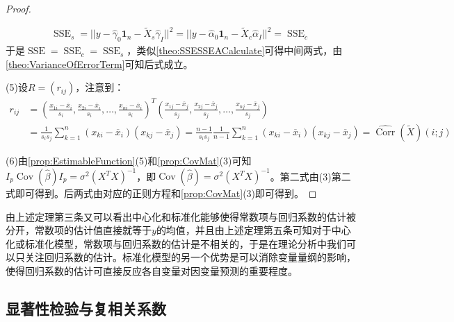 \begin{proof}
\begin{gather*}
\begin{aligned}
		\end{aligned} \\
		\operatorname{SSE}_s=||y-\hat{\gamma}_0\mathbf{1}_n-\tilde{X}_s\hat{\gamma}_I||^2=||y-\hat{\alpha}_0\mathbf{1}_n-\tilde{X}_c\hat{\alpha}_I||^2=\operatorname{SSE}_c
	\end{gather*}
	于是$\operatorname{SSE}=\operatorname{SSE}_c=\operatorname{SSE}_s$，类似\cref{theo:SSESSEACalculate}可得中间两式，由\cref{theo:VarianceOfErrorTerm}可知后式成立。\par
	(5)设$R=(r_{ij})$，注意到：
	\begin{align*}
		r_{ij}&=\left(\frac{x_{1i}-\overline{x}_i}{s_i},\frac{x_{2i}-\overline{x}_i}{s_i},\dots,\frac{x_{ni}-\overline{x}_i}{s_i}\right)^T\left(\frac{x_{1j}-\overline{x}_j}{s_j},\frac{x_{2j}-\overline{x}_j}{s_j},\dots,\frac{x_{nj}-\overline{x}_j}{s_j}\right) \\
		&=\frac{1}{s_is_j}\sum_{k=1}^{n}(x_{ki}-\overline{x}_i)(x_{kj}-\overline{x}_j)=\frac{n-1}{s_is_j}\frac{1}{n-1}\sum_{k=1}^{n}(x_{ki}-\overline{x}_i)(x_{kj}-\overline{x}_j)=\widehat{\operatorname{Corr}}(\tilde{X})(i;j)
	\end{align*}\par
	(6)由\cref{prop:EstimableFunction}(5)和\cref{prop:CovMat}(3)可知$I_p\operatorname{Cov}(\hat{\beta})I_p=\sigma^2(X^TX)^{-1}$，即$\operatorname{Cov}(\hat{\beta})=\sigma^2(X^TX)^{-1}$。第二式由(3)第二式即可得到。后两式由对应的正则方程和\cref{prop:CovMat}(3)即可得到。
\end{proof}
\begin{note}
	由上述定理第三条又可以看出中心化和标准化能够使得常数项与回归系数的估计被分开，常数项的估计值直接就等于$y$的均值，并且由上述定理第五条可知对于中心化或标准化模型，常数项与回归系数的估计是不相关的，于是在理论分析中我们可以只关注回归系数的估计。标准化模型的另一个优势是可以消除变量量纲的影响，使得回归系数的估计可直接反应各自变量对因变量预测的重要程度。
\end{note}

\subsection{显著性检验与复相关系数}
